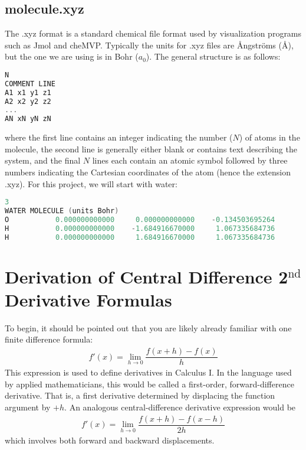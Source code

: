 \documentclass[11pt]{article}
\newcommand{\ttf}[1]{{\ttfamily #1}}
\newcommand{\fr}[2]{\dfrac{#1}{#2}}
\begin{document}
\subsection{\ttf{molecule.xyz}}
The \ttf{.xyz} format is a standard chemical file format used by visualization programs such as Jmol and cheMVP.
Typically the units for \ttf{.xyz} files are \AA ngstr\"oms (\AA), but the one we are using is in Bohr ($a_0$).
The general structure is as follows:
\begin{addmargin}{2cm}{}
\begin{lstlisting}[language=c++]
N
COMMENT LINE
A1 x1 y1 z1
A2 x2 y2 z2
...
AN xN yN zN
\end{lstlisting}
\end{addmargin}
where the first line contains an integer indicating the number ($N$) of atoms in the molecule, the second line is generally either blank or contains text describing the system, and the final $N$ lines each contain an atomic symbol followed by three numbers indicating the Cartesian coordinates of the atom (hence the extension \ttf{.xyz}).
For this project, we will start with water:
\begin{addmargin}{2cm}{}
\begin{lstlisting}[language=c++]
3
WATER MOLECULE (units Bohr)
O           0.000000000000     0.000000000000    -0.134503695264
H           0.000000000000    -1.684916670000     1.067335684736
H           0.000000000000     1.684916670000     1.067335684736
\end{lstlisting}
\end{addmargin}



\newpage
\section{Derivation of Central Difference 2$^\text{nd}$ Derivative Formulas}

To begin, it should be pointed out that you are likely already familiar with one finite difference formula:
\begin{align*}
	f'(x) = \lim_{h\rightarrow0} \fr{f(x+h)-f(x)}{h}
\end{align*}
This expression is used to define derivatives in Calculus I.
In the language used by applied mathematicians, this would be called a first-order, forward-difference derivative.
That is, a first derivative determined by displacing the function argument by $+h$.
An analogous central-difference derivative expression would be
\begin{align*}
	f'(x) = \lim_{h\rightarrow0} \fr{f(x+h)-f(x-h)}{2h} 
\end{align*}
which involves both forward and backward displacements.
\end{document}
